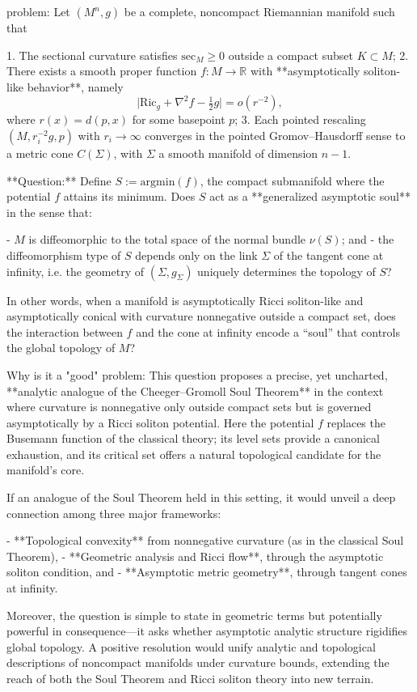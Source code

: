 problem:  
Let \( (M^n,g) \) be a complete, noncompact Riemannian manifold such that  

1. The sectional curvature satisfies \( \mathrm{sec}_M \ge 0 \) outside a compact subset \( K \subset M \);  
2. There exists a smooth proper function \( f:M \to \mathbb{R} \) with **asymptotically soliton-like behavior**, namely  
   \[
   \big|\mathrm{Ric}_g + \nabla^2 f - \tfrac{1}{2}g\big| = o(r^{-2}),
   \]
   where \(r(x) = d(p,x)\) for some basepoint \(p\);  
3. Each pointed rescaling \( (M, r_i^{-2} g, p) \) with \( r_i\to\infty \) converges in the pointed Gromov–Hausdorff sense to a metric cone \( C(\Sigma) \), with \(\Sigma\) a smooth manifold of dimension \(n-1\).  

**Question:**  
Define \( S := \mathrm{argmin}(f)\), the compact submanifold where the potential \(f\) attains its minimum.  
Does \(S\) act as a **generalized asymptotic soul** in the sense that:  

- \( M \) is diffeomorphic to the total space of the normal bundle \(\nu(S)\); and  
- the diffeomorphism type of \( S \) depends only on the link \(\Sigma\) of the tangent cone at infinity, i.e. the geometry of \( (\Sigma,g_\Sigma) \) uniquely determines the topology of \(S\)?  

In other words, when a manifold is asymptotically Ricci soliton-like and asymptotically conical with curvature nonnegative outside a compact set, does the interaction between \(f\) and the cone at infinity encode a “soul” that controls the global topology of \(M\)?  

Why is it a "good" problem:  
This question proposes a precise, yet uncharted, **analytic analogue of the Cheeger–Gromoll Soul Theorem** in the context where curvature is nonnegative only outside compact sets but is governed asymptotically by a Ricci soliton potential.  Here the potential \(f\) replaces the Busemann function of the classical theory; its level sets provide a canonical exhaustion, and its critical set offers a natural topological candidate for the manifold’s core.  

If an analogue of the Soul Theorem held in this setting, it would unveil a deep connection among three major frameworks:  

- **Topological convexity** from nonnegative curvature (as in the classical Soul Theorem),  
- **Geometric analysis and Ricci flow**, through the asymptotic soliton condition, and  
- **Asymptotic metric geometry**, through tangent cones at infinity.  

Moreover, the question is simple to state in geometric terms but potentially powerful in consequence—it asks whether asymptotic analytic structure rigidifies global topology. A positive resolution would unify analytic and topological descriptions of noncompact manifolds under curvature bounds, extending the reach of both the Soul Theorem and Ricci soliton theory into new terrain.